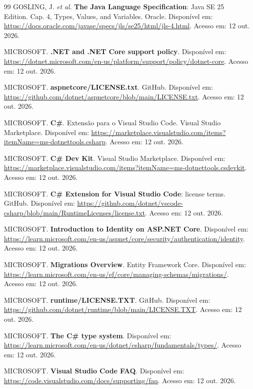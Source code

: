 \documentclass[a4paper]{article}
\begin{document}
\begin{thebibliography}{99}
GOSLING, J. \textit{et al.} \textbf{The Java Language Specification}: Java SE 25 Edition. Cap. 4, Types, Values, and Variables. Oracle. Disponível em: \url{https://docs.oracle.com/javase/specs/jls/se25/html/jls-4.html}. Acesso em: 12 out. 2026.

MICROSOFT. \textbf{.NET and .NET Core support policy}. Disponível em: \url{https://dotnet.microsoft.com/en-us/platform/support/policy/dotnet-core}. Acesso em: 12 out. 2026.

MICROSOFT. \textbf{aspnetcore/LICENSE.txt}. GitHub. Disponível em: \url{https://github.com/dotnet/aspnetcore/blob/main/LICENSE.txt}. Acesso em: 12 out. 2026.

MICROSOFT. \textbf{C\#}. Extensão para o Visual Studio Code. Visual Studio Marketplace. Disponível em: \url{https://marketplace.visualstudio.com/items?itemName=ms-dotnettools.csharp}. Acesso em: 12 out. 2026.

MICROSOFT. \textbf{C\# Dev Kit}. Visual Studio Marketplace. Disponível em: \url{https://marketplace.visualstudio.com/items?itemName=ms-dotnettools.csdevkit}. Acesso em: 12 out. 2026.

MICROSOFT. \textbf{C\# Extension for Visual Studio Code}: license terms. GitHub. Disponível em: \url{https://github.com/dotnet/vscode-csharp/blob/main/RuntimeLicenses/license.txt}. Acesso em: 12 out. 2026.

MICROSOFT. \textbf{Introduction to Identity on ASP.NET Core}. Disponível em: \url{https://learn.microsoft.com/en-us/aspnet/core/security/authentication/identity}. Acesso em: 12 out. 2026.

MICROSOFT. \textbf{Migrations Overview}. Entity Framework Core. Disponível em: \url{https://learn.microsoft.com/en-us/ef/core/managing-schemas/migrations/}. Acesso em: 12 out. 2026.

MICROSOFT. \textbf{runtime/LICENSE.TXT}. GitHub. Disponível em: \url{https://github.com/dotnet/runtime/blob/main/LICENSE.TXT}. Acesso em: 12 out. 2026.

MICROSOFT. \textbf{The C\# type system}. Disponível em: \url{https://learn.microsoft.com/en-us/dotnet/csharp/fundamentals/types/}. Acesso em: 12 out. 2026.

MICROSOFT. \textbf{Visual Studio Code FAQ}. Disponível em: \url{https://code.visualstudio.com/docs/supporting/faq}. Acesso em: 12 out. 2026.


\end{thebibliography}
\end{document}
